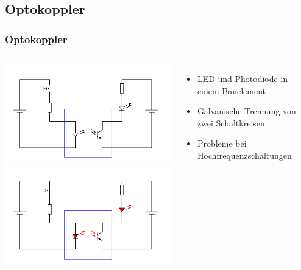 \subsection*{Optokoppler}
\begin{frame}
    \frametitle{Optokoppler}
    \begin{columns}[c]
        \begin{center}
            \includegraphics[width=1\textwidth,height=.4\textheight,keepaspectratio]{a05/Optokoppler_Aus.png}\\
            \includegraphics[width=1\textwidth,height=.4\textheight,keepaspectratio]{a05/Optokoppler_An.png}
            \tiny \hyperlink{refs}{\cite{wm}}
        \end{center}
    \begin{itemize}
			\item LED und Photodiode in einem Bauelement
			\item Galvanische Trennung von zwei Schaltkreisen
			\item Probleme bei Hochfrequenzschaltungen
    \end{itemize}
    \end{columns}
\end{frame}


